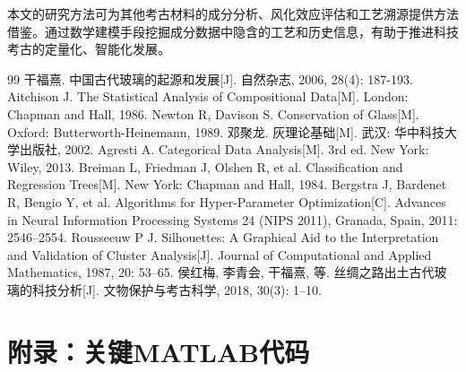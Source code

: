 \documentclass[12pt,a4paper]{ctexart}
\begin{document}
本文的研究方法可为其他考古材料的成分分析、风化效应评估和工艺溯源提供方法借鉴。通过数学建模手段挖掘成分数据中隐含的工艺和历史信息，有助于推进科技考古的定量化、智能化发展。

\newpage

\begin{thebibliography}{99}
 干福熹. 中国古代玻璃的起源和发展[J]. 自然杂志, 2006, 28(4): 187-193.
 Aitchison J. The Statistical Analysis of Compositional Data[M]. London: Chapman and Hall, 1986.
 Newton R, Davison S. Conservation of Glass[M]. Oxford: Butterworth-Heinemann, 1989.
 邓聚龙. 灰理论基础[M]. 武汉: 华中科技大学出版社, 2002.
 Agresti A. Categorical Data Analysis[M]. 3rd ed. New York: Wiley, 2013.
 Breiman L, Friedman J, Olshen R, et al. Classification and Regression Trees[M]. New York: Chapman and Hall, 1984.
 Bergstra J, Bardenet R, Bengio Y, et al. Algorithms for Hyper-Parameter Optimization[C]. Advances in Neural Information Processing Systems 24 (NIPS 2011), Granada, Spain, 2011: 2546--2554.
 Rousseeuw P J. Silhouettes: A Graphical Aid to the Interpretation and Validation of Cluster Analysis[J]. Journal of Computational and Applied Mathematics, 1987, 20: 53--65.
 侯红梅, 李青会, 干福熹, 等. 丝绸之路出土古代玻璃的科技分析[J]. 文物保护与考古科学, 2018, 30(3): 1--10.
\end{thebibliography}

\newpage

\section*{附录：关键MATLAB代码}
\end{document}
